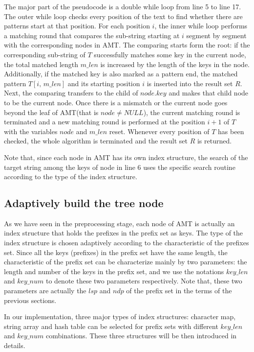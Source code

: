 \documentclass[legalpaper]{article}
\begin{document}
The major part of the pseudocode is a double \textsf{while} loop from
line 5 to line 17. The outer \textsf{while} loop checks every position
of the text to find whether there are patterns start at that
position. For each position $i$, the inner \textsf{while} loop
performs a matching round that compares the sub-string starting at $i$
segment by segment with the corresponding nodes in \textsf{AMT}. The
comparing starts form the root: if the corresponding sub-string of $T$
successfully matches some key in the current node, the total matched
length $m\_len$ is increased by the length of the keys in the
node. Additionally, if the matched key is also marked as a pattern
end, the matched pattern $T[i,\,m\_len]$ and its starting position $i$
is inserted into the result set $R$. Next, the comparing transfers to
the child of $node.key$ and makes that child node to be the current
node. Once there is a mismatch or the current node goes beyond the
leaf of \textsf{AMT}(that is $node \neq NULL$), the current matching
round is terminated and a new matching round is performed at the
position $i+1$ of $T$ with the variables $node$ and $m\_len$
reset. Whenever every position of $T$ has been checked, the whole
algorithm is terminated and the result set $R$ is returned.

Note that, since each node in \textsf{AMT} has its own index
structure, the search of the target string among the keys of node in
line 6 uses the specific search routine according to the type of the
index structure.

\subsection{Adaptively build the tree node}
\label{sec:ad}

As we have seen in the preprocessing stage, each node of \textsf{AMT}
is actually an index structure that holds the prefixes in the prefix
set as keys. The type of the index structure is chosen adaptively
according to the characteristic of the prefixes set. Since all the
keys (prefixes) in the prefix set have the same length, the
characteristic of the prefix set can be characterize mainly by two
parameters: the \textsf{length} and \textsf{number} of the keys in the
prefix set, and we use the notations $key\_len$ and $key\_num$ to
denote these two parameters respectively. Note that, these two
parameters are actually the $lsp$ and $ndp$ of the prefix set in the
terms of the previous sections.

In our implementation, three major types of index structures:
\textsf{character map}, \textsf{string array} and \textsf{hash table}
can be selected for prefix sets with different $key\_len$ and
$key\_num$ combinations. These three structures will be then
introduced in details.
\end{document}
